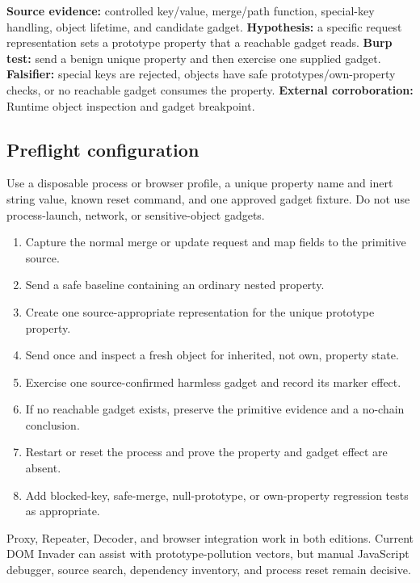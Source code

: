 \documentclass[11pt]{article}
\newcommand{\weekfield}[2]{%
  \Needspace{5\baselineskip}
  \subsection*{#1}
  #2
}
\newcommand{\externalproof}[1]{\textbf{External corroboration:} #1}
\begin{document}
\begin{bridgebox}
\textbf{Source evidence:} controlled key/value, merge/path function, special-key
handling, object lifetime, and candidate gadget. \textbf{Hypothesis:} a specific
request representation sets a prototype property that a reachable gadget reads.
\textbf{Burp test:} send a benign unique property and then exercise one supplied
gadget. \textbf{Falsifier:} special keys are rejected, objects have safe
prototypes/own-property checks, or no reachable gadget consumes the property.
\externalproof{Runtime object inspection and gadget breakpoint.}
\end{bridgebox}

\weekfield{Preflight configuration}{Use a disposable process or browser profile,
a unique property name and inert string value, known reset command, and one
approved gadget fixture. Do not use process-launch, network, or sensitive-object
gadgets.}

\begin{procedurebox}
\begin{enumerate}
  \item Capture the normal merge or update request and map fields to the primitive source.
  \item Send a safe baseline containing an ordinary nested property.
  \item Create one source-appropriate representation for the unique prototype property.
  \item Send once and inspect a fresh object for inherited, not own, property state.
  \item Exercise one source-confirmed harmless gadget and record its marker effect.
  \item If no reachable gadget exists, preserve the primitive evidence and a no-chain conclusion.
  \item Restart or reset the process and prove the property and gadget effect are absent.
  \item Add blocked-key, safe-merge, null-prototype, or own-property regression tests as appropriate.
\end{enumerate}
\end{procedurebox}

\begin{editionbox}
Proxy, Repeater, Decoder, and browser integration work in both editions. Current
DOM Invader can assist with prototype-pollution vectors, but manual JavaScript
debugger, source search, dependency inventory, and process reset remain decisive.
\end{editionbox}
\end{document}
